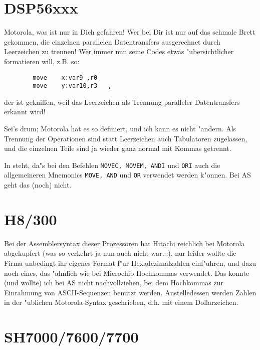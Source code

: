 \documentclass[12pt,a4paper,twoside]{report}
\newcommand{\tty}[1]{{\tt #1}}
\begin{document}
{%

\section{DSP56xxx}

Motorola, was ist nur in Dich gefahren!  Wer bei Dir ist nur auf das
schmale Brett gekommen, die einzelnen parallelen Datentransfers
ausgerechnet durch Leerzeichen zu trennen!  Wer immer nun seine Codes
etwas "ubersichtlicher formatieren will, z.B. so:
\begin{verbatim}
        move    x:var9 ,r0
        move    y:var10,r3   ,
\end{verbatim}
der ist gekniffen, weil das Leerzeichen als Trennung paralleler
Datentransfers erkannt wird!
\par
Sei's drum; Motorola hat es so definiert, und ich kann es nicht
"andern.  Als Trennung der Operationen sind statt Leerzeichen auch
Tabulatoren zugelassen, und die einzelnen Teile sind ja wieder ganz
normal mit Kommas getrennt.
\par
In \cite{Mot56} steht, da"s bei den Befehlen \tty{MOVEC, MOVEM, ANDI} und
\tty{ORI} auch die allgemeineren Mnemonics \tty{MOVE, AND} und \tty{OR}
verwendet werden k"onnen.  Bei AS geht das (noch) nicht.


\section{H8/300}

Bei der Assemblersyntax dieser Prozessoren hat Hitachi reichlich
bei Motorola abgekupfert (was so verkehrt ja nun auch nicht war...),
nur leider wollte die Firma unbedingt ihr eigenes Format f"ur
Hexadezimalzahlen einf"uhren, und dazu noch eines, das "ahnlich wie
bei Microchip Hochkommas verwendet.  Das konnte (und wollte) ich bei
AS nicht nachvollziehen, bei dem Hochkommas zur Einrahmung von
ASCII-Sequenzen benutzt werden.  Anstelledessen werden Zahlen in der
"ublichen Motorola-Syntax geschrieben, d.h. mit einem Dollarzeichen.


\section{SH7000/7600/7700}

}
\end{document}

